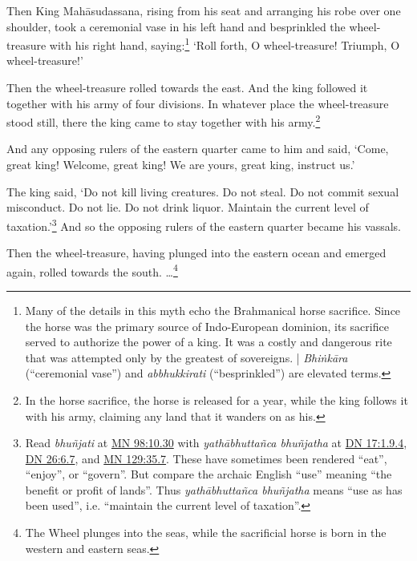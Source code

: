 \documentclass[12pt,openany]{book}%
\begin{document}
Then King \textsanskrit{Mahāsudassana}, rising from his seat and arranging his robe over one shoulder, took a ceremonial vase in his left hand and besprinkled the wheel-treasure with his right hand, saying:\footnote{Many of the details in this myth echo the Brahmanical horse sacrifice. Since the horse was the primary source of Indo-European dominion, its sacrifice served to authorize the power of a king. It was a costly and dangerous rite that was attempted only by the greatest of sovereigns. | \textit{\textsanskrit{Bhiṅkāra}} (“ceremonial vase”) and \textit{abbhukkirati} (“besprinkled”) are elevated terms. } ‘Roll forth, O wheel-treasure! Triumph, O wheel-treasure!’ 

Then the wheel-treasure rolled towards the east. And the king followed it together with his army of four divisions. In whatever place the wheel-treasure stood still, there the king came to stay together with his army.\footnote{In the horse sacrifice, the horse is released for a year, while the king follows it with his army, claiming any land that it wanders on as his. } 

And any opposing rulers of the eastern quarter came to him and said, ‘Come, great king! Welcome, great king! We are yours, great king, instruct us.’ 

The king said, ‘Do not kill living creatures. Do not steal. Do not commit sexual misconduct. Do not lie. Do not drink liquor. Maintain the current level of taxation.’\footnote{Read \textit{\textsanskrit{bhuñjati}} at \href{https://suttacentral.net/mn98/en/sujato\#10.30}{MN 98:10.30} with \textit{\textsanskrit{yathābhuttañca} \textsanskrit{bhuñjatha}} at \href{https://suttacentral.net/dn17/en/sujato\#1.9.4}{DN 17:1.9.4}, \href{https://suttacentral.net/dn26/en/sujato\#6.7}{DN 26:6.7}, and \href{https://suttacentral.net/mn129/en/sujato\#35.7}{MN 129:35.7}. These have sometimes been rendered “eat”, “enjoy”, or “govern”. But compare the archaic English “use” meaning “the benefit or profit of lands”. Thus \textit{\textsanskrit{yathābhuttañca} \textsanskrit{bhuñjatha}} means “use as has been used”, i.e. “maintain the current level of taxation”. } And so the opposing rulers of the eastern quarter became his vassals. 

Then the wheel-treasure, having plunged into the eastern ocean and emerged again, rolled towards the south. …\footnote{The Wheel plunges into the seas, while the sacrificial horse is born in the western and eastern seas. } 
\end{document}
